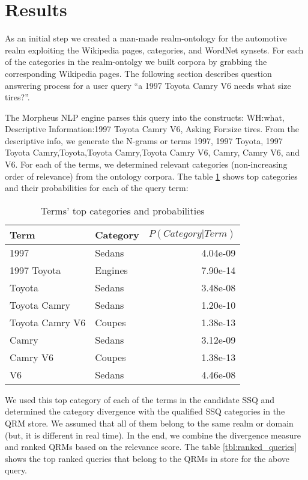 \section{Results}
\label{sec:results}


As an initial step we created a man-made realm-ontology for the automotive realm
 exploiting the Wikipedia pages, categories, and WordNet synsets. For each of
the categories in the realm-ontolgy we built corpora by grabbing the
corresponding Wikipedia pages. The following section describes question
answering process for a user query ``a 1997 Toyota Camry V6 needs what size
tires?''. 

The Morpheus NLP engine parses this query into the constructs: WH:what,
Descriptive Information:1997 Toyota Camry V6, Asking For:size tires. From the
descriptive info, we generate the N-grams or terms 1997, 1997 Toyota, 1997
Toyota Camry,Toyota,Toyota Camry,Toyota Camry V6, Camry, Camry V6, and V6. For
each of the terms, we determined relevant categories (non-increasing order of
relevance) from the ontology corpora. The table \ref{tbl:term_categories} shows
top categories and their probabilities for each of the query term: 

\begin{table}[h]\footnotesize

\begin{tabular}{l | l | r}
Term & Category & $P(Category|Term)$ \\
\hline
1997 & Sedans & 4.04e-09\\
1997 Toyota & Engines & 7.90e-14\\
Toyota  & Sedans & 3.48e-08\\
Toyota Camry & Sedans & 1.20e-10\\
Toyota Camry V6 & Coupes & 1.38e-13\\
Camry & Sedans & 3.12e-09\\
Camry V6 & Coupes & 1.38e-13\\
V6 & Sedans & 4.46e-08\\
\hline
\end{tabular}        

\caption{Terms' top categories and probabilities}
\label{tbl:term_categories}   

\end{table}

We used this top category of each of the terms in the candidate SSQ and
determined the category divergence with the qualified SSQ categories in the QRM
store. We assumed that all of them belong to the same realm or domain (but, it
is different in real time). In the end, we combine the divergence measure and
ranked QRMs based on the relevance score. The table \ref{tbl:ranked_queries}
shows the top ranked queries that belong to the QRMs in store for the above
query.

